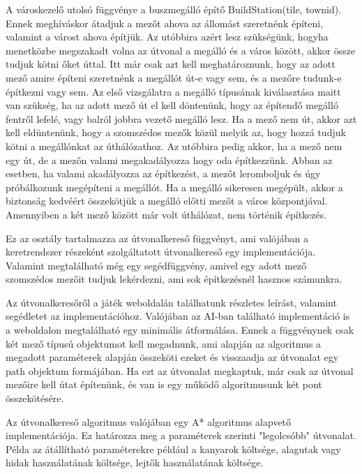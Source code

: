 A városkezelő utolsó függvénye a buszmegálló építő BuildStation(tile, townid). Ennek meghíváskor átadjuk a mezőt ahova az állomást szeretnénk építeni, valamint a várost ahova építjük. Az utóbbira azért lesz szükségünk, hogyha menetközbe megszakadt volna az útvonal a megálló és a város között, akkor össze tudjuk kötni őket úttal. Itt már csak azt kell meghatároznunk, hogy az adott mező amire építeni szeretnénk a megállót út-e vagy sem, és a mezőre tudunk-e építkezni vagy sem. Az első vizsgálatra a megálló típusának kiválasztása maitt van szükség, ha az adott mező út el kell döntenünk, hogy az építendő megálló fentről lefelé, vagy balról jobbra vezető megálló lesz. Ha a mező nem út, akkor azt kell eldüntenünk, hogy a szomszédos mezők közül melyik az, hogy hozzá tudjuk kötni a megállónkat az úthálózathoz. Az utóbbira pedig akkor, ha a mező nem egy út, de a mezőn valami megakadályozza hogy oda építkezzünk. Abban az esetben, ha valami akadályozza az építkezést, a mezőt leromboljuk és úgy próbálkozunk megépíteni a megállót. Ha a megálló sikeresen megépült, akkor a biztonság kedvéért összekötjük a megálló előtti mezőt a város központjával. Amennyiben a két mező között már volt úthálózat, nem történik építkezés.


Ez az osztály tartalmazza az útvonalkereső függvényt, ami valójában a keretrendszer részeként szolgáltatott útvonalkereső egy implementációja. Valamint megtalálható még egy segédfüggvény, amivel egy adott mező szomszédos mezőit tudjuk lekérdezni, ami sok építkezésnél hasznos számunkra.

Az útvonalkeresőről a játék weboldalán találhatunk részletes leírást, valamint segédletet az implementációhoz. Valójában az AI-ban található implementáció is a weboldalon megtalálható egy minimális átformálása. Ennek a függvénynek csak két mező típusú objektumot kell megadnunk, ami alapján az algoritmus a megadott paraméterek alapján összeköti ezeket és visszaadja az útvonalat egy path objektum formájában. Ha ezt az útvonalat megkaptuk, már csak az útvonal mezőire kell útat építenünk, és van is egy működő algoritmusunk két pont összekötésére.

Az útvonalkereső algoritmus valójában egy A* algoritmus alapvető implementációja. Ez határozza meg a paraméterek szerinti "legolcsóbb" útvonalat. Példa az átállítható paraméterekre például a kanyarok költsége, alagutak vagy hidak használatának költsége, lejtők használatának költsége.


